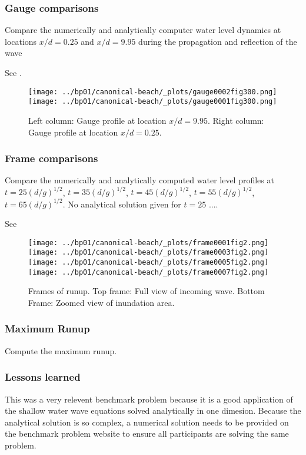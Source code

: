 \subsubsection{Gauge comparisons}
Compare the numerically and analytically computer water level dynamics at locations $x/d = 0.25$ and $x/d = 9.95$ during the propagation and reflection of the wave


See .

\begin{figure}[ht]
\hfil\texttt{[image: ../bp01/canonical-beach/\_plots/gauge0002fig300.png]}\hfil
\hfil\texttt{[image: ../bp01/canonical-beach/\_plots/gauge0001fig300.png]}\hfil
\caption{\label{fig:bp1gauges} 
Left column: Gauge profile at location $x/d = 9.95$.
Right column: Gauge profile at location $x/d = 0.25$.
 }
\end{figure}



\subsubsection{Frame comparisons}
Compare the numerically and analytically computed water level profiles at $t = 25(d/g)^{1/2}$, $t = 35(d/g)^{1/2}$, $t = 45(d/g)^{1/2}$, $t = 55(d/g)^{1/2}$, $t = 65(d/g)^{1/2}$.
No analytical solution given for $ t = 25$ ....

See 
\begin{figure}[ht]
\hfil\texttt{[image: ../bp01/canonical-beach/\_plots/frame0001fig2.png]}\hfil
\hfil\texttt{[image: ../bp01/canonical-beach/\_plots/frame0003fig2.png]}\hfil
\vskip 5pt
\hfil\texttt{[image: ../bp01/canonical-beach/\_plots/frame0005fig2.png]}\hfil
\hfil\texttt{[image: ../bp01/canonical-beach/\_plots/frame0007fig2.png]}\hfil
\caption{\label{fig:bp1frames} 
Frames of runup. Top frame: Full view of incoming wave. Bottom Frame: Zoomed view of inundation area.}
\end{figure}

\subsubsection{Maximum Runup}
Compute the maximum runup.

\subsubsection{Lessons learned}

This was a very relevent benchmark problem because it is a good
application of the shallow water wave equations solved analytically
in one dimesion. Because the analytical solution is so complex, a
numerical solution needs to be provided on the benchmark problem
website to ensure all participants are solving the same problem.
